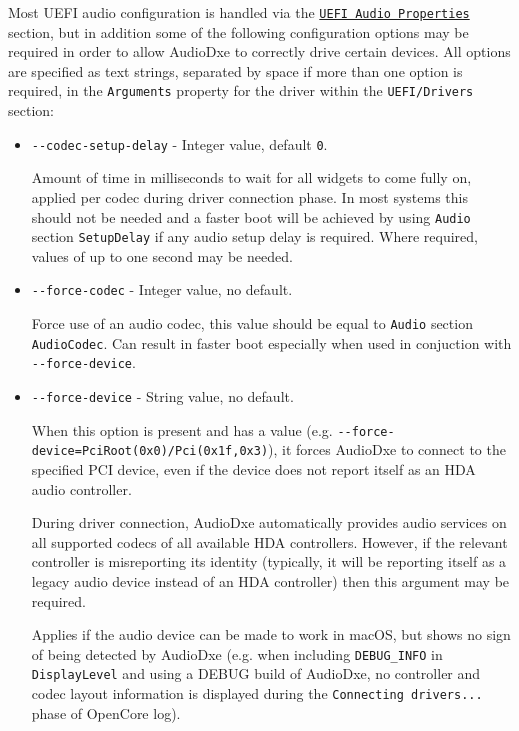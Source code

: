\documentclass[]{article}
\providecommand{\tightlist}{%
  \setlength{\itemsep}{0pt}\setlength{\parskip}{0pt}}
\begin{document}
Most UEFI audio configuration is handled via the \hyperref[uefiaudioprops]{\texttt{UEFI Audio Properties}}
section, but in addition some of the following configuration options may be required in order
to allow AudioDxe to correctly drive certain devices. All options are specified as text strings,
separated by space if more than one option is required, in the \texttt{Arguments} property for
the driver within the \texttt{UEFI/Drivers} section:

\begin{itemize}
  \tightlist
  \item \texttt{-{}-codec-setup-delay} - Integer value, default \texttt{0}. \medskip

  Amount of time in milliseconds to wait for all widgets to come fully on, applied per codec
  during driver connection phase. In most systems this should not be needed and a faster boot
  will be achieved by using \texttt{Audio} section \texttt{SetupDelay} if any audio setup delay
  is required. Where required, values of up to one second may be needed. \medskip

  \item \texttt{-{}-force-codec} - Integer value, no default. \medskip

  Force use of an audio codec, this value should be equal to \texttt{Audio} section \texttt{AudioCodec}.
  Can result in faster boot especially when used in conjuction with \texttt{-{}-force-device}. \medskip

  \item \texttt{-{}-force-device} - String value, no default. \medskip

  When this option is present and has a value (e.g. \texttt{-{}-force-device=PciRoot(0x0)/Pci(0x1f,0x3)}), it
  forces AudioDxe to connect to the specified PCI device, even if the device does not report itself as
  an HDA audio controller.

  During driver connection, AudioDxe automatically provides audio services on all supported codecs of
  all available HDA controllers. However, if the relevant controller is misreporting its identity
  (typically, it will be reporting itself as a legacy audio device instead of an HDA controller)
  then this argument may be required.

  Applies if the audio device can be made to work in macOS, but shows no sign of being detected by AudioDxe
  (e.g. when including \texttt{DEBUG\_INFO} in \texttt{DisplayLevel} and using a DEBUG build of AudioDxe,
  no controller and codec layout information is displayed during the \texttt{Connecting drivers...}
  phase of OpenCore log). \medskip


\end{itemize}
\end{document}
